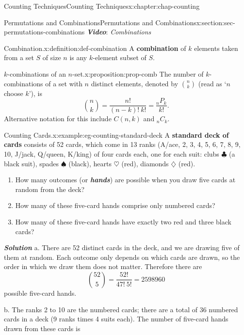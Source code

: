 \documentclass[oneside,10pt,]{book}
\newcommand{\alert}[1]{\textbf{\textit{#1}}}
\newcommand{\terminology}[1]{\textbf{#1}}
\numberwithin{equation}{section}
\begin{document}
\begin{chapterptx}{Counting Techniques}{}{Counting Techniques}{}{}{x:chapter:chap-counting}
\begin{sectionptx}{Permutations and Combinations}{}{Permutations and Combinations}{}{}{x:section:sec-permutations-combinations}
\alert{Video}: \emph{Combinations}%
\begin{definition}{Combination.}{x:definition:def-combination}%
\label{g:notation:id461018} A \terminology{combination} of \(k\) elements taken from a set \(S\) of size \(n\) is any \(k\)-element subset of \(S\).%
\end{definition}
\begin{proposition}{\(k\)-combinations of an \(n\)-set.}{}{x:proposition:prop-comb}%
The number of \(k\)-combinations of a set with \(n\) distinct elements, denoted by \(\displaystyle\binom{n}{k}\) (read as `\(n\) choose \(k\)'), is%
\begin{equation*}
\binom{n}{k} = \dfrac{n!}{(n-k)!\ k!} = \dfrac{{}_nP_k}{k!}\text{.}
\end{equation*}
Alternative notation for this include \(C(n,k)\) and \(_nC_k\).%
\end{proposition}
\begin{example}{Counting Cards.}{x:example:eg-counting-standard-deck}%
A \terminology{standard deck of cards} consists of 52 cards, which come in 13 ranks (A\slash{}ace, 2, 3, 4, 5, 6, 7, 8, 9, 10, J\slash{}jack, Q\slash{}queen, K\slash{}king) of four cards each, one for each suit: clubs \(\clubsuit\) (a black suit), spades \(\spadesuit\) (black), hearts \(\heartsuit\) (red), diamonds \(\diamondsuit\) (red).%
\begin{enumerate}[label=(\alph*)]
\item{}How many outcomes (or \alert{hands}) are possible when you draw five cards at random from the deck?%
\item{}How many of these five-card hands comprise only numbered cards?%
\item{}How many of these five-card hands have exactly two red and three black cards?%
\end{enumerate}
%
\par
\alert{Solution} a. There are 52 distinct cards in the deck, and we are drawing five of them at random. Each outcome only depends on which cards are drawn, so the order in which we draw them does not matter. Therefore there are%
\begin{equation*}
\binom{52}{5} = \frac{52!}{47! \ 5!} = 2598960
\end{equation*}
possible five-card hands.%
\par
b. The ranks 2 to 10 are the numbered cards; there are a total of 36 numbered cards in a deck (9 ranks times 4 suits each). The number of five-card hands drawn from these cards is%
\begin{equation*}

\end{equation*}
\end{example}
\end{sectionptx}
\end{chapterptx}
\end{document}
